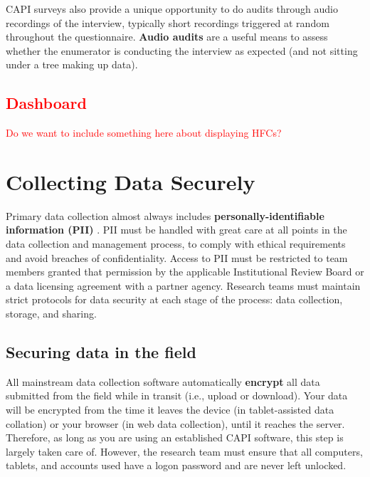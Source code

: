 {CAPI surveys also provide a unique opportunity to do audits through audio recordings of the interview, typically short recordings triggered at random throughout the questionnaire. 
\textbf{Audio audits} are a useful means to assess whether the enumerator is conducting the interview as expected (and not sitting under a tree making up data).

\textcolor{red}{
\subsection{Dashboard}
Do we want to include something here about displaying HFCs? }


\section{Collecting Data Securely}
Primary data collection almost always includes  \textbf{personally-identifiable information (PII)} 
. 
PII must be handled with great care at all points in the data collection and management process, to comply with ethical requirements and avoid breaches of confidentiality. Access to PII must be restricted to team members granted that permission by the applicable Institutional Review Board or a data licensing agreement with a partner agency. Research teams must maintain strict protocols for data security at each stage of the process: data collection, storage, and sharing. 

\subsection{Securing data in the field}
All mainstream data collection software automatically \textbf{encrypt}
all data submitted from the field while in transit (i.e., upload or download).  Your data will be encrypted from the time it leaves the device (in tablet-assisted data collation) or your browser (in web data collection), until it reaches the server. Therefore, as long as you are using an established CAPI software, this step is largely taken care of. However, the research team must ensure that all computers, tablets, and accounts used have a logon password and are never left unlocked. 

}
